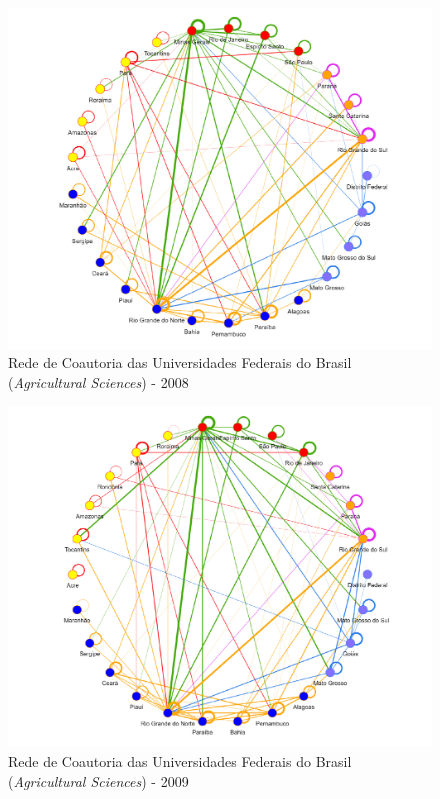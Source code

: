 \begin{figure}[H]
	\centering
	\includegraphics[width=\linewidth]{Imagens/rede-agr-br-2008.pdf}
	\caption{Rede de Coautoria das Universidades Federais do Brasil (\textit{Agricultural Sciences}) - 2008}
	\label{Rede de Coautoria - UF AGRI BR 2008}
\end{figure}

\begin{figure}[H]
	\centering
	\includegraphics[width=\linewidth]{Imagens/rede-agr-br-2009.pdf}
	\caption{Rede de Coautoria das Universidades Federais do Brasil (\textit{Agricultural Sciences}) - 2009}
	\label{Rede de Coautoria - UF AGRI BR 2009}
\end{figure}

